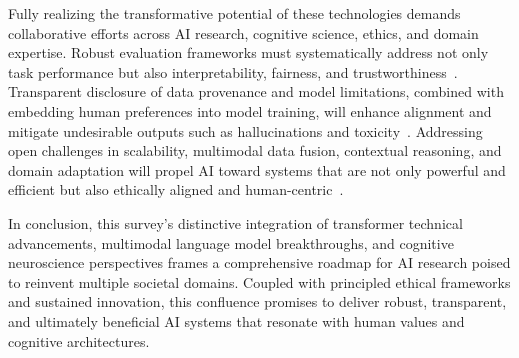 \documentclass[sigconf]{acmart}
\begin{document}
Fully realizing the transformative potential of these technologies demands collaborative efforts across AI research, cognitive science, ethics, and domain expertise. Robust evaluation frameworks must systematically address not only task performance but also interpretability, fairness, and trustworthiness~\cite{ref36}. Transparent disclosure of data provenance and model limitations, combined with embedding human preferences into model training, will enhance alignment and mitigate undesirable outputs such as hallucinations and toxicity~\cite{ref39,ref41}. Addressing open challenges in scalability, multimodal data fusion, contextual reasoning, and domain adaptation will propel AI toward systems that are not only powerful and efficient but also ethically aligned and human-centric~\cite{ref40,ref41}.

In conclusion, this survey’s distinctive integration of transformer technical advancements, multimodal language model breakthroughs, and cognitive neuroscience perspectives frames a comprehensive roadmap for AI research poised to reinvent multiple societal domains. Coupled with principled ethical frameworks and sustained innovation, this confluence promises to deliver robust, transparent, and ultimately beneficial AI systems that resonate with human values and cognitive architectures.



\end{document}
